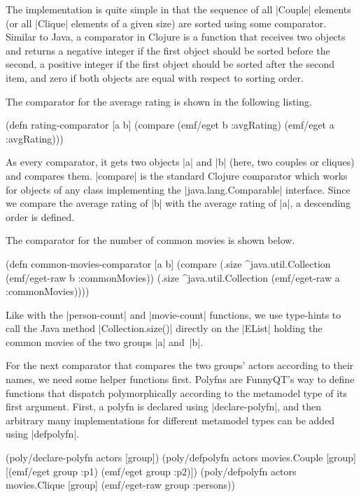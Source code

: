 \documentclass[submission]{eptcs}
\newcommand{\code}{\clojureinline}
\begin{document}
The implementation is quite simple in that the sequence of all \code|Couple|
elements (or all \code|Clique| elements of a given size) are sorted using some
comparator.  Similar to Java, a comparator in Clojure is a function that
receives two objects and returns a negative integer if the first object should
be sorted before the second, a positive integer if the first object should be
sorted after the second item, and zero if both objects are equal with respect
to sorting order.

The comparator for the average rating is shown in the following listing.

\begin{clojurecode}
(defn rating-comparator [a b]
  (compare (emf/eget b :avgRating) (emf/eget a :avgRating)))
\end{clojurecode}

As every comparator, it gets two objects \code|a| and \code|b| (here, two
couples or cliques) and compares them.  \code|compare| is the standard Clojure
comparator which works for objects of any class implementing the
\code|java.lang.Comparable| interface.  Since we compare the average rating of
\code|b| with the average rating of \code|a|, a descending order is defined.

The comparator for the number of common movies is shown below.

\begin{clojurecode}
(defn common-movies-comparator [a b]
  (compare (.size ^java.util.Collection (emf/eget-raw b :commonMovies))
           (.size ^java.util.Collection (emf/eget-raw a :commonMovies))))
\end{clojurecode}

Like with the \code|person-count| and \code|movie-count| functions, we use
type-hints to call the Java method \code|Collection.size()| directly on the
\code|EList| holding the common movies of the two groups \code|a| and~\code|b|.

For the next comparator that compares the two groups' actors according to their
names, we need some helper functions first.  Polyfns are FunnyQT's way to
define functions that dispatch polymorphically according to the metamodel type
of its first argument.  First, a polyfn is declared using
\code|declare-polyfn|, and then arbitrary many implementations for different
metamodel types can be added using \code|defpolyfn|.

\begin{clojurecode}
(poly/declare-polyfn actors [group])
(poly/defpolyfn actors movies.Couple [group]
  [(emf/eget group :p1) (emf/eget group :p2)])
(poly/defpolyfn actors movies.Clique [group]
  (emf/eget-raw group :persons))
\end{clojurecode}
\end{document}
